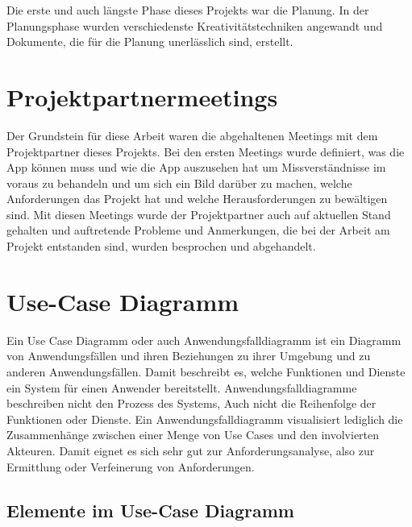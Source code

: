 
Die erste und auch längste Phase dieses Projekts war die Planung. 
In der Planungsphase wurden verschiedenste Kreativitätstechniken angewandt und Dokumente, die für die Planung unerlässlich sind, erstellt.

\section{Projektpartnermeetings}

Der Grundstein für diese Arbeit waren die abgehaltenen Meetings mit dem Projektpartner dieses Projekts. Bei den ersten Meetings wurde definiert, was die App können muss und wie die App auszusehen hat
um Missverständnisse im voraus zu behandeln und um sich ein Bild darüber zu machen, welche Anforderungen das Projekt hat und welche Herausforderungen zu bewältigen sind. 
Mit diesen Meetings wurde der Projektpartner auch auf aktuellen Stand gehalten und auftretende Probleme und Anmerkungen, 
die bei der Arbeit am Projekt entstanden sind, wurden besprochen und abgehandelt.

\section{Use-Case Diagramm}

Ein Use Case Diagramm \cite{UseCaseDiagramm} oder auch Anwendungsfalldiagramm ist ein Diagramm von Anwendungsfällen und ihren Beziehungen zu ihrer Umgebung und zu anderen Anwendungsfällen. 
Damit beschreibt es, welche Funktionen und Dienste ein System für einen Anwender bereitstellt.
Anwendungsfalldiagramme beschreiben nicht den Prozess des Systems,
Auch nicht die Reihenfolge der Funktionen oder Dienste.
Ein Anwendungsfalldiagramm visualisiert lediglich die Zusammenhänge zwischen einer Menge von Use Cases und den involvierten Akteuren. Damit eignet es sich sehr gut zur Anforderungsanalyse, also zur Ermittlung oder Verfeinerung von Anforderungen.
\pagebreak
\subsection{Elemente im Use-Case Diagramm}

